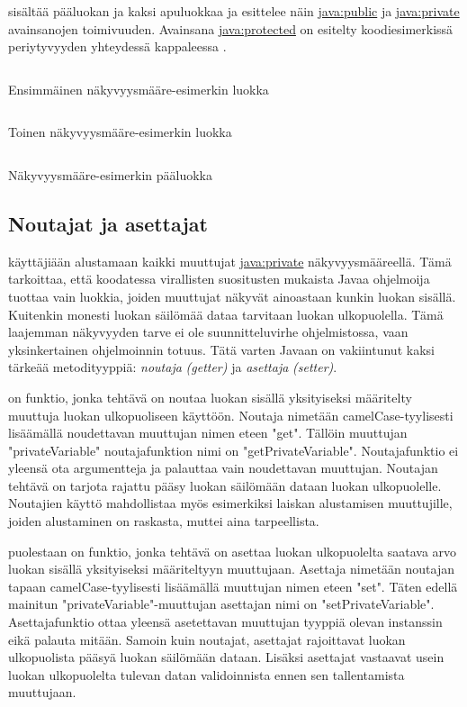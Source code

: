 \documentclass{tufte-book}
\newcommand{\eng}[1]{\textit{(#1)}}
\newcommand{\new}[1]{\textit{\gls{#1}}}
\newcommand{\neweng}[2]{\new{#1} \eng{#2}}
\newcommand{\java}[1]{\underline{\gls{java:#1}}}
\newcommand{\code}[3]{
\begin{listing}
    \inputminted{java}{OhjelmointiopasEsimerkit/src/#1/#2.java}
    \caption{#3}
    \label{Java-#1-#2}
\end{listing}
}
\begin{document}
 sisältää pääluokan ja kaksi apuluokkaa ja esittelee näin
\java{public} ja \java{private} avainsanojen toimivuuden. Avainsana \java{protected} on esitelty
koodiesimerkissä periytyvyyden yhteydessä kappaleessa .

\code{week2/accessmodifierexample}{FirstClass}{Ensimmäinen näkyvyysmääre-esimerkin luokka}
\code{week2/accessmodifierexample}{SecondClass}{Toinen näkyvyysmääre-esimerkin luokka}
\code{week2/accessmodifierexample}{AccessModifierExample}{Näkyvyysmääre-esimerkin pääluokka}

\subsection{Noutajat ja asettajat}
\label{get set}

 käyttäjiään alustamaan kaikki muuttujat \java{private} näkyvyysmääreellä.
Tämä tarkoittaa, että koodatessa virallisten suositusten mukaista Javaa ohjelmoija tuottaa vain
luokkia, joiden muuttujat näkyvät ainoastaan kunkin luokan sisällä. Kuitenkin monesti luokan
säilömää dataa tarvitaan luokan ulkopuolella. Tämä laajemman näkyvyyden tarve ei ole
suunnitteluvirhe ohjelmistossa, vaan yksinkertainen ohjelmoinnin totuus. Tätä varten Javaan on
vakiintunut kaksi tärkeää metodityyppiä: \neweng{noutaja}{getter} ja \neweng{asettaja}{setter}.

 on funktio, jonka tehtävä on noutaa luokan sisällä yksityiseksi
määritelty muuttuja luokan ulkopuoliseen käyttöön. Noutaja nimetään camelCase-tyylisesti
lisäämällä noudettavan muuttujan nimen eteen "get". Tällöin muuttujan "privateVariable"
noutajafunktion nimi on "getPrivateVariable". Noutajafunktio ei yleensä ota argumentteja ja
palauttaa vain noudettavan muuttujan. Noutajan tehtävä on tarjota rajattu pääsy luokan
säilömään dataan luokan ulkopuolelle. Noutajien käyttö mahdollistaa myös esimerkiksi laiskan
alustamisen muuttujille, joiden alustaminen on raskasta, muttei aina tarpeellista.

 puolestaan on funktio, jonka tehtävä on asettaa luokan
ulkopuolelta saatava arvo luokan sisällä yksityiseksi määriteltyyn muuttujaan. Asettaja nimetään
noutajan tapaan camelCase-tyylisesti lisäämällä muuttujan nimen eteen "set". Täten edellä mainitun
"privateVariable"-muuttujan asettajan nimi on "setPrivateVariable". Asettajafunktio ottaa yleensä
asetettavan muuttujan tyyppiä olevan instanssin eikä palauta mitään. Samoin kuin noutajat,
asettajat rajoittavat luokan ulkopuolista pääsyä luokan säilömään dataan. Lisäksi asettajat
vastaavat usein luokan ulkopuolelta tulevan datan validoinnista ennen sen tallentamista
muuttujaan.
\end{document}
